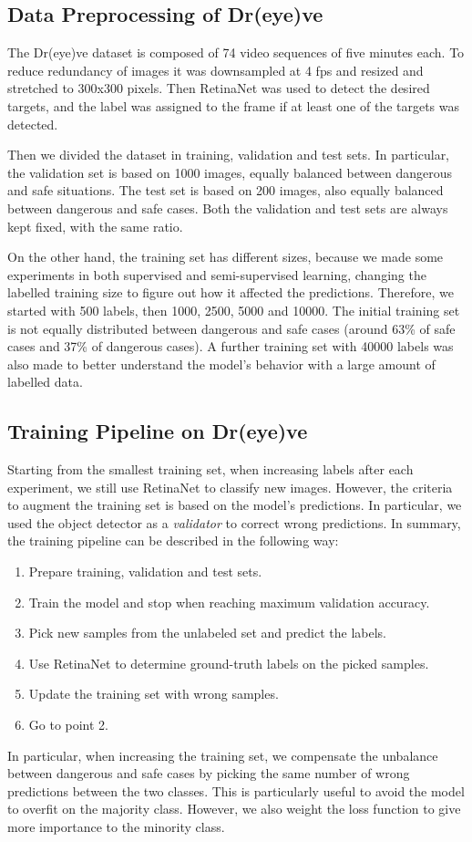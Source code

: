 \subsection{Data Preprocessing of Dr(eye)ve}
The Dr(eye)ve dataset is composed of 74 video sequences of five minutes each.
To reduce redundancy of images it was downsampled at 4 fps and resized and 
stretched to 300x300 pixels. Then RetinaNet \cite{retinanet} was used to detect 
the desired targets, 
and the label was assigned to the frame if at least one of the targets was detected.

Then we divided the dataset in training, validation and test sets. In particular,
the validation set is based on 1000 images, 
equally balanced between dangerous and safe situations.
The test set is based on 200 images, also equally balanced between dangerous 
and safe cases.
Both the validation and test sets are always kept fixed, with the same ratio.

On the other hand, the training set has different sizes, because we made some 
experiments in both supervised and semi-supervised learning, changing the 
labelled training size to figure out how it affected the predictions.
Therefore, we started with 500 labels, then 1000, 2500, 5000 and 10000.
The initial training set is not equally distributed between dangerous and safe 
cases (around 63\% of safe cases and 37\% of dangerous cases).
A further training set with 40000 labels was also made to better understand the 
model's behavior with a large amount of labelled data.

\subsection{Training Pipeline on Dr(eye)ve}
Starting from the smallest training set, when increasing labels after each 
experiment, we still use RetinaNet to classify new images. However, the criteria 
to augment the training set is based on the model's predictions. In particular, 
we used the object detector as a \emph{validator} to correct wrong predictions.
In summary, the training pipeline can be described in the following way:
%
\begin{enumerate}
    \addtolength\itemsep{-2mm}
    \item Prepare training, validation and test sets.
    \item Train the model and stop when reaching maximum validation accuracy.
    \item Pick new samples from the unlabeled set and predict the labels.
    \item Use RetinaNet to determine ground-truth labels on the picked samples.
    \item Update the training set with wrong samples.
    \item Go to point 2.
\end{enumerate}
In particular, when increasing the training set, we compensate the unbalance 
between dangerous and safe cases by picking the same number of wrong predictions 
between the two classes. This is particularly useful to avoid the model to 
overfit on the majority class.
However, we also weight the loss function to give more importance to the 
minority class.

